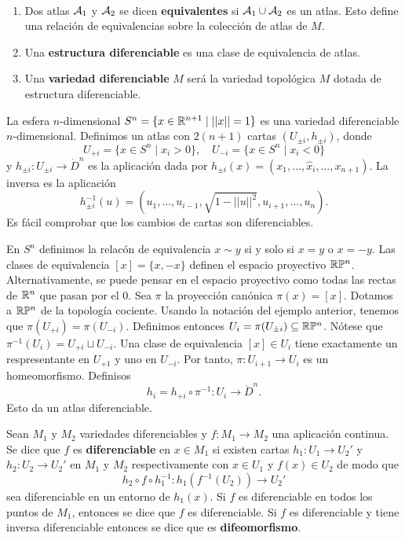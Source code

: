 \documentclass[CV.tex]{subfiles}
\begin{document}
\newpage

\begin{defi}\
\begin{enumerate}
\item Dos atlas $\mathcal{A}_1$ y $\mathcal{A}_2$ se dicen \textbf{equivalentes} si $\mathcal{A}_1\cup\mathcal{A}_2$ es un atlas. Esto define una relación de equivalencias sobre la colección de atlas de $M$. 
\item Una \textbf{estructura diferenciable} es una clase de equivalencia de atlas.
\item Una \textbf{variedad diferenciable} $M$ será la variedad topológica $M$ dotada de estructura diferenciable.
\end{enumerate}
\end{defi}

\begin{ej}\label{8.5}
La esfera $n$-dimensional $S^n=\{x\in\mathbb{R}^{n+1}\mid ||x||=1\}$ es una variedad diferenciable $n$-dimensional. Definimos un atlas con $2(n+1)$ cartas $(U_{\pm i}, h_{\pm i})$, donde
\[
U_{+i}=\{x\in S^n\mid x_i>0\},\quad U_{-i}=\{x\in S^n\mid x_i<0\}
\]
y $h_{\pm i}:U_{\pm i}\to\mathring{D}^n$ es la aplicación dada por $h_{\pm i}(x)=(x_1,\dots, \hat{x}_i,\dots, x_{n+1})$. La inversa es la aplicación
\[
h_{\pm i}^{-1}(u)=(u_1,\dots, u_{i-1}, \sqrt{1-||u||^2}, u_{i+1},\dots, u_n).
\]
Es fácil comprobar que los cambios de cartas son diferenciables. 
\end{ej}

\begin{ej}
En $S^n$ definimos la relacón de equivalencia $x\sim y $ si y solo si $x=y$ o $x=-y$. Las clases de equivalencia $[x]=\{x,-x\}$ definen el espacio proyectivo $\mathbb{R}\mathbb{P}^n$. Alternativamente, se puede pensar en el espacio proyectivo como todas las rectas de $\mathbb{R}^n$ que pasan por el 0. Sea $\pi$ la proyección canónica $\pi(x)=[x]$. Dotamos a $\mathbb{R}\mathbb{P}^n$ de la topología cociente. Usando la notación del ejemplo anterior, tenemos que $\pi(U_{+i})=\pi(U_{-i})$. Definimos entonces $U_i=\pi(U_{\pm i})\subseteq\mathbb{R}\mathbb{P}^n$. Nótese que $\pi^{-1}(U_i)=U_{+i}\sqcup U_{-i}$. Una clase de equivalencia $[x]\in U_i$ tiene exactamente un respresentante en $U_{+1}$ y uno en $U_{-i}$. Por tanto, $\pi:U_{i+1}\to U_i$ es un homeomorfismo. Definisos
\[
h_i=h_{+i}\circ\pi^{-1}:U_i\to\mathring{D}^n.
\]
Esto da un atlas diferenciable. 
\end{ej}

\begin{defi}
Sean $M_1$ y $M_2$ variedades diferenciables y $f:M_1\to M_2$ una aplicación continua. Se dice que $f$ es \textbf{diferenciable} en $x\in M_1$ si existen cartas $h_1:U_1\to U_2'$ y $h_2:U_2\to U_2'$ en $M_1$ y $M_2$ respectivamente con $x\in U_1$ y $f(x)\in U_2$ de modo que
\[
h_2\circ f\circ h_1^{-1}:h_1(f^{-1}(U_2))\to U_2'
\]
sea diferenciable en un entorno de $h_1(x)$. Si $f$ es diferenciable en todos los puntos de $M_1$, entonces se dice que $f$ es diferenciable. Si $f$ es diferenciable y tiene inversa diferenciable entonces se dice que es \textbf{difeomorfismo}.
\end{defi}
\end{document}
